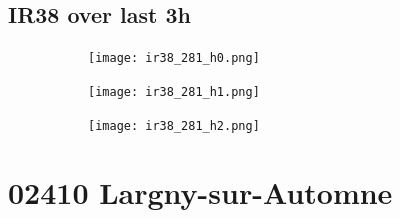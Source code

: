 \documentclass{article}
\begin{document}
\vspace{-1em}
\subsection*{IR38 over last 3h}
\vspace{-1em}
\begin{figure}[H]
    \centering
    \begin{subfigure}[b]{0.32\textwidth}
        \centering
        \texttt{[image: ir38\_281\_h0.png]} %
    \end{subfigure}
    \begin{subfigure}[b]{0.32\textwidth}
        \centering
        \texttt{[image: ir38\_281\_h1.png]} %
    \end{subfigure}
    \begin{subfigure}[b]{0.32\textwidth}
        \centering
        \texttt{[image: ir38\_281\_h2.png]} %
    \end{subfigure}
\end{figure}

\vspace{-1em}
\section*{02410 Largny-sur-Automne}
\vspace{-1em}
\end{document}
